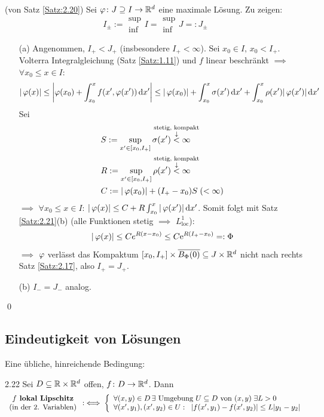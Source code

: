 \documentclass[a4paper]{article}
\begin{document}
\begin{Beweis}
(von Satz \ref{Satz:2.20}) Sei $\operatorname{\varphi}\colon J\supseteq I\to\mathbb R^d$ eine maximale Lösung. Zu zeigen:
\[I_{\pm}:=\begin{array}{l}\sup\\\inf\end{array}
I=\begin{array}{l}\sup\\\inf\end{array}J=:J_{\pm}\]
\begin{itemize}
\item[(a)]Angenommen, $I_+<J_+$ (insbesondere $I_+<\infty$). Sei $x_0\in I,\,x_0<I_+$. Volterra Integralgleichung (Satz \ref{Satz:1.11}) und $f$ linear beschränkt $\implies$ $\forall x_0\le x\in I$:
\[|\operatorname{\varphi}(x)|\le \left|\operatorname{\varphi}(x_0)+\int_{x_0}^xf(x',\operatorname{\varphi}(x'))\mathop{}\!\mathrm{d} x'\right|
\le |\operatorname{\varphi}(x_0)|+\int_{x_0}^x\sigma(x')\mathop{}\!\mathrm{d} x'+\int_{x_0}^x\rho(x')|\operatorname{\varphi}(x')|\mathop{}\!\mathrm{d} x'
\]
Sei 
\begin{align*}
&S:=\sup_{x'\in[x_0,I_+]}\sigma(x')\overset{\mathclap{\substack{\text{stetig, kompakt}\\\downarrow}}}{<}\infty\\
&R:=\sup_{x'\in[x_0,I_+]}\rho(x')\overset{\mathclap{\substack{\text{stetig, kompakt}\\\downarrow}}}{<}\infty\\
&C:=|\vp(x_0)|+(I_+-x_0)S\;(<\infty)
\end{align*}
$\implies$ $\forall x_0\le x\in I$: $|\operatorname{\varphi}(x)|\le C+R\int_{x_0}^x|\operatorname{\varphi}(x')|\mathop{}\!\mathrm{d} x'$. Somit folgt mit Satz \ref{Satz:2.21}(b) (alle Funktionen stetig $\implies$ $L^1_{\mathrm{loc}}$):
\[|\operatorname{\varphi}(x)|\le Ce^{R(x-x_0)}\le C\mathrm{e}^{R(I_+-x_0)}=:\Phi\]
$\implies$ $\operatorname{\varphi}$ verlässt das Kompaktum $[x_0,I_+]\times \overline{B_{\Phi}(0)}\subseteq J\times \mathbb R^d$ nicht nach rechts \lightning{} Satz \ref{Satz:2.17}, also $I_+=J_+$.
\item[(b)] $I_-=J_-$ analog.
\end{itemize}
\qed
\end{Beweis}

\subsection{Eindeutigkeit von Lösungen}
Eine übliche, hinreichende Bedingung:

\begin{Def}{}{2.22}
Sei $D\subseteq \mathbb R\times\mathbb R^d$ offen, $f\colon D\to\mathbb R^d$. Dann
\[\begin{array}{c}
f\textbf{ lokal Lipschitz}\\
\text{(in der 2. Variablen)}
\end{array} :\iff \left\{\begin{array}{l}
\forall (x,y)\in D\,\exists\text{ Umgebung $U\subseteq D$ von }(x,y)\;\exists L>0\\
\forall (x',y_1),(x',y_2)\in U:\;\;|f(x',y_1)-f(x',y_2)|\le L|y_1-y_2|
\end{array}\right. \]
\end{Def}
\end{document}
